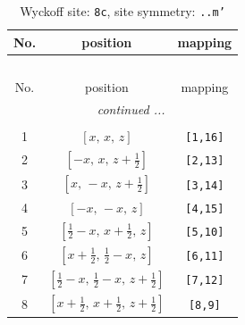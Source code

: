 \documentclass[fleqn,8pt]{jsarticle}
\begin{document}
\renewcommand{\arraystretch}{1.2}
\begin{longtable}{ccc}
\caption{Wyckoff site: {\tt 8c}, site symmetry: {\tt ..m'}}
 \\
 \hline \hline
No. & position & mapping \\ \hline \endfirsthead

\multicolumn{2}{l}{\tablename\ \thetable{}} \\
 \hline \hline
No. & position & mapping \\ \hline \endhead

 \hline \hline
\multicolumn{2}{r}{\footnotesize\it continued ...} \\ \endfoot

 \hline \hline
\multicolumn{2}{r}{} \\ \endlastfoot

1 & $\left[ x,\, x,\, z \right]$ & {\tt [1,16]} \\ \hline
2 & $\left[ - x,\, x,\, z + \frac{1}{2} \right]$ & {\tt [2,13]} \\ \hline
3 & $\left[ x,\, - x,\, z + \frac{1}{2} \right]$ & {\tt [3,14]} \\ \hline
4 & $\left[ - x,\, - x,\, z \right]$ & {\tt [4,15]} \\ \hline
5 & $\left[ \frac{1}{2} - x,\, x + \frac{1}{2},\, z \right]$ & {\tt [5,10]} \\ \hline
6 & $\left[ x + \frac{1}{2},\, \frac{1}{2} - x,\, z \right]$ & {\tt [6,11]} \\ \hline
7 & $\left[ \frac{1}{2} - x,\, \frac{1}{2} - x,\, z + \frac{1}{2} \right]$ & {\tt [7,12]} \\ \hline
8 & $\left[ x + \frac{1}{2},\, x + \frac{1}{2},\, z + \frac{1}{2} \right]$ & {\tt [8,9]} \\
\end{longtable}
\renewcommand{\arraystretch}{1.2}
\end{document}
